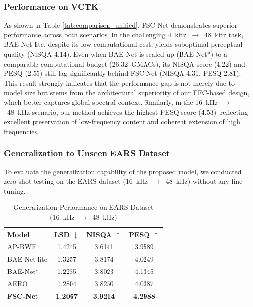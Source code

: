 \documentclass[journal]{IEEEtran}
\begin{document}
\subsubsection{Performance on VCTK}
As shown in Table \ref{tab:comparison_unified}, FSC-Net demonstrates superior performance across both scenarios. 
In the challenging 4~kHz~$\to$~48~kHz task, BAE-Net lite, despite its low computational cost, yields suboptimal perceptual quality (NISQA 4.14). Even when BAE-Net is scaled up (BAE-Net*) to a comparable computational budget (26.32~GMACs), its NISQA score (4.22) and PESQ (2.55) still lag significantly behind FSC-Net (NISQA 4.31, PESQ 2.81). This result strongly indicates that the performance gap is not merely due to model size but stems from the architectural superiority of our FFC-based design, which better captures global spectral context.
Similarly, in the 16~kHz~$\to$~48~kHz scenario, our method achieves the highest PESQ score (4.53), reflecting excellent preservation of low-frequency content and coherent extension of high frequencies.

\subsubsection{Generalization to Unseen EARS Dataset}
To evaluate the generalization capability of the proposed model, we conducted zero-shot testing on the EARS dataset \cite{ears} (16~kHz~$\to$~48~kHz) without any fine-tuning.

\begin{table}[htbp]
\vspace{-0.2cm}
\caption{Generalization Performance on EARS Dataset (16~kHz~$\to$~48~kHz)}
\label{tab:ears}
\centering

\footnotesize

\setlength{\tabcolsep}{10pt} 
\begin{tabular}{l|c|c|c}
\hline
\textbf{Model} & \textbf{LSD} $\downarrow$ & \textbf{NISQA} $\uparrow$ & \textbf{PESQ} $\uparrow$ \\
\hline
AP-BWE \cite{AP-BWE} & 1.4245 & 3.6141 & 3.9589 \\
BAE-Net lite \cite{baenet} & 1.3257 & 3.8174 & 4.0249 \\
BAE-Net* & 1.2235 & 3.8023 & 4.1345 \\
AERO \cite{aero} & 1.2804 & 3.8250 & 4.0387 \\
\textbf{FSC-Net} & \textbf{1.2067} & \textbf{3.9214} & \textbf{4.2988} \\
\hline
\end{tabular}
\vspace{-0.2cm}
\end{table}
\end{document}
